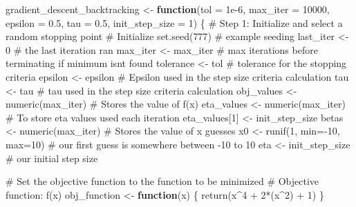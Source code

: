 \documentclass[
  letterpaper,
  DIV=11,
  numbers=noendperiod]{scrartcl}
\newenvironment{Shaded}{\begin{snugshade}}{\end{snugshade}}
\newcommand{\AttributeTok}[1]{\textcolor[rgb]{0.40,0.45,0.13}{#1}}
\newcommand{\CommentTok}[1]{\textcolor[rgb]{0.37,0.37,0.37}{#1}}
\newcommand{\ControlFlowTok}[1]{\textcolor[rgb]{0.00,0.23,0.31}{\textbf{#1}}}
\newcommand{\DecValTok}[1]{\textcolor[rgb]{0.68,0.00,0.00}{#1}}
\newcommand{\FloatTok}[1]{\textcolor[rgb]{0.68,0.00,0.00}{#1}}
\newcommand{\FunctionTok}[1]{\textcolor[rgb]{0.28,0.35,0.67}{#1}}
\newcommand{\NormalTok}[1]{\textcolor[rgb]{0.00,0.23,0.31}{#1}}
\newcommand{\OtherTok}[1]{\textcolor[rgb]{0.00,0.23,0.31}{#1}}
\newcommand{\SpecialCharTok}[1]{\textcolor[rgb]{0.37,0.37,0.37}{#1}}
\begin{document}
\begin{Shaded}
\begin{Highlighting}[]
\NormalTok{gradient\_descent\_backtracking }\OtherTok{\textless{}{-}} \ControlFlowTok{function}\NormalTok{(}\AttributeTok{tol =} \FloatTok{1e{-}6}\NormalTok{, }\AttributeTok{max\_iter =} \DecValTok{10000}\NormalTok{, }\AttributeTok{epsilon =} \FloatTok{0.5}\NormalTok{, }\AttributeTok{tau =} \FloatTok{0.5}\NormalTok{, }\AttributeTok{init\_step\_size =} \DecValTok{1}\NormalTok{) \{}
  \CommentTok{\# Step 1: Initialize and select a random stopping point}
  \CommentTok{\# Initialize}
  \FunctionTok{set.seed}\NormalTok{(}\DecValTok{777}\NormalTok{) }\CommentTok{\# example seeding }
\NormalTok{  last\_iter }\OtherTok{\textless{}{-}} \DecValTok{0} \CommentTok{\# the last iteration ran}
\NormalTok{  max\_iter }\OtherTok{\textless{}{-}}\NormalTok{ max\_iter }\CommentTok{\# max iterations before terminating if minimum isn\textquotesingle{}t found}
\NormalTok{  tolerance }\OtherTok{\textless{}{-}}\NormalTok{ tol }\CommentTok{\# tolerance for the stopping criteria }
\NormalTok{  epsilon }\OtherTok{\textless{}{-}}\NormalTok{ epsilon }\CommentTok{\# Epsilon used in the step size criteria calculation}
\NormalTok{  tau }\OtherTok{\textless{}{-}}\NormalTok{ tau }\CommentTok{\# tau used in the step size criteria calculation}
\NormalTok{  obj\_values }\OtherTok{\textless{}{-}} \FunctionTok{numeric}\NormalTok{(max\_iter) }\CommentTok{\# Stores the value of f(x)}
\NormalTok{  eta\_values }\OtherTok{\textless{}{-}} \FunctionTok{numeric}\NormalTok{(max\_iter)  }\CommentTok{\# To store eta values used each iteration}
\NormalTok{  eta\_values[}\DecValTok{1}\NormalTok{] }\OtherTok{\textless{}{-}}\NormalTok{ init\_step\_size}
\NormalTok{  betas }\OtherTok{\textless{}{-}} \FunctionTok{numeric}\NormalTok{(max\_iter) }\CommentTok{\# Stores the value of x guesses}
\NormalTok{  x0 }\OtherTok{\textless{}{-}} \FunctionTok{runif}\NormalTok{(}\DecValTok{1}\NormalTok{, }\AttributeTok{min=}\SpecialCharTok{{-}}\DecValTok{10}\NormalTok{, }\AttributeTok{max=}\DecValTok{10}\NormalTok{) }\CommentTok{\# our first guess is somewhere between {-}10 to 10}
\NormalTok{  eta }\OtherTok{\textless{}{-}}\NormalTok{ init\_step\_size }\CommentTok{\# our initial step size}
  
  \CommentTok{\# Set the objective function to the function to be minimized }
  \CommentTok{\# Objective function: f(x)}
\NormalTok{  obj\_function }\OtherTok{\textless{}{-}} \ControlFlowTok{function}\NormalTok{(x) \{}
    \FunctionTok{return}\NormalTok{(x}\SpecialCharTok{\^{}}\DecValTok{4} \SpecialCharTok{+} \DecValTok{2}\SpecialCharTok{*}\NormalTok{(x}\SpecialCharTok{\^{}}\DecValTok{2}\NormalTok{) }\SpecialCharTok{+} \DecValTok{1}\NormalTok{) }
\NormalTok{  \}}
  

\end{Highlighting}
\end{Shaded}
\end{document}
